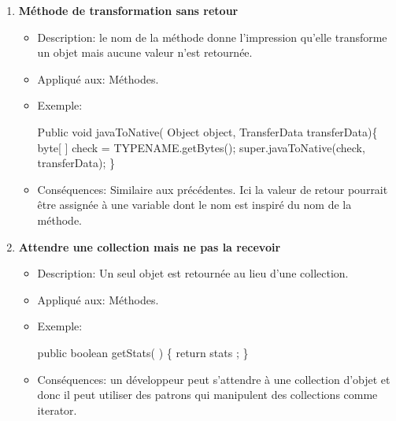 \begin{enumerate}
\item \textbf {Méthode de transformation sans retour}
\begin{itemize}
\item Description: le nom de la méthode donne l’impression qu’elle transforme un objet mais aucune valeur n’est retournée.
\item Appliqué aux: Méthodes.
\item Exemple: 
\begin{framed}

{\selectfont
Public void javaToNative(
Object object, TransferData transferData)\{
byte[ ] check = TYPENAME.getBytes();
super.javaToNative(check, transferData);
\}
}
\end{framed}

\item Conséquences: Similaire aux précédentes. Ici la valeur de retour pourrait être assignée à une variable dont le nom est inspiré du nom de la méthode.
\end{itemize}

\item \textbf{Attendre une collection mais ne pas la recevoir}
\begin{itemize}
\item Description: Un seul objet est retournée au lieu d’une collection.
\item Appliqué aux: Méthodes.
\item Exemple:
\begin{framed}

{\selectfont

public boolean getStats( ) \{ return stats ; \}
}
\end{framed}
\item Conséquences: un développeur peut s’attendre à une collection d’objet et donc il peut utiliser des patrons qui manipulent des collections comme iterator.
\end{itemize}
\end{enumerate}
